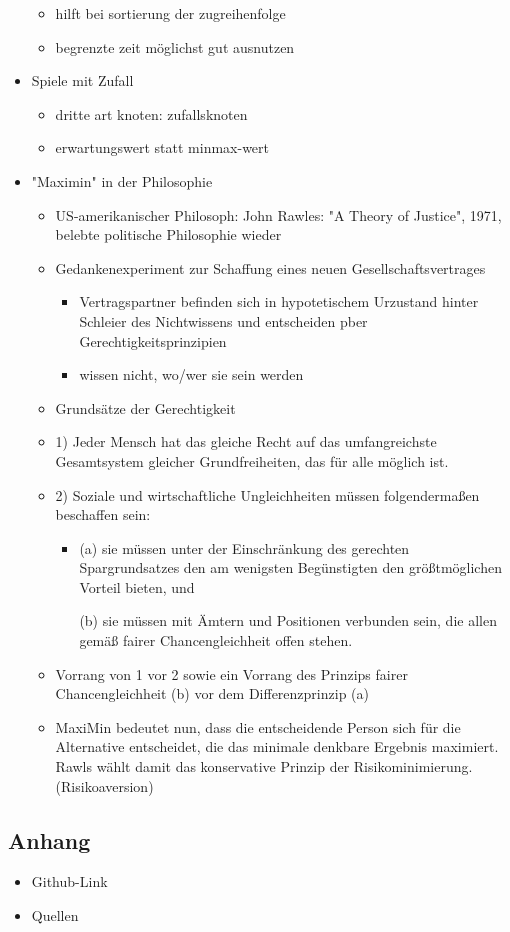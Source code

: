 \documentclass[]{article}
\begin{document}
\begin{itemize}
  \begin{itemize}
  \item
    hilft bei sortierung der zugreihenfolge
  \item
    begrenzte zeit möglichst gut ausnutzen
  \end{itemize}
\item
  Spiele mit Zufall

  \begin{itemize}
  \item
    dritte art knoten: zufallsknoten
  \item
    erwartungswert statt minmax-wert
  \end{itemize}
\item
  "Maximin" in der Philosophie

  \begin{itemize}
  \item
    US-amerikanischer Philosoph: John Rawles: "A Theory of Justice",
    1971, belebte politische Philosophie wieder
  \item
    Gedankenexperiment zur Schaffung eines neuen Gesellschaftsvertrages

    \begin{itemize}
    \item
      Vertragspartner befinden sich in hypotetischem Urzustand hinter
      Schleier des Nichtwissens und entscheiden pber
      Gerechtigkeitsprinzipien
    \item
      wissen nicht, wo/wer sie sein werden
    \end{itemize}
  \item
    Grundsätze der Gerechtigkeit
  \item
    1) Jeder Mensch hat das gleiche Recht auf das umfangreichste
    Gesamtsystem gleicher Grundfreiheiten, das für alle möglich ist.
  \item
    2) Soziale und wirtschaftliche Ungleichheiten müssen folgendermaßen
    beschaffen sein:

    \begin{itemize}
    \item
      (a) sie müssen unter der Einschränkung des gerechten
      Spargrundsatzes den am wenigsten Begünstigten den größtmöglichen
      Vorteil bieten, und

      (b) sie müssen mit Ämtern und Positionen verbunden sein, die allen
      gemäß fairer Chancengleichheit offen stehen.
    \end{itemize}
  \item
    Vorrang von 1 vor 2 sowie ein Vorrang des Prinzips fairer
    Chancengleichheit (b) vor dem Differenzprinzip (a)
  \item
    MaxiMin bedeutet nun, dass die entscheidende Person sich für die
    Alternative entscheidet, die das minimale denkbare Ergebnis
    maximiert. Rawls wählt damit das konservative Prinzip der
    Risikominimierung. (Risikoaversion)
  \end{itemize}
\end{itemize}

\hypertarget{header-n597}{%
\subsection{Anhang}\label{header-n597}}

\begin{itemize}
\item
  Github-Link
\item
  Quellen
\end{itemize}
\end{document}
